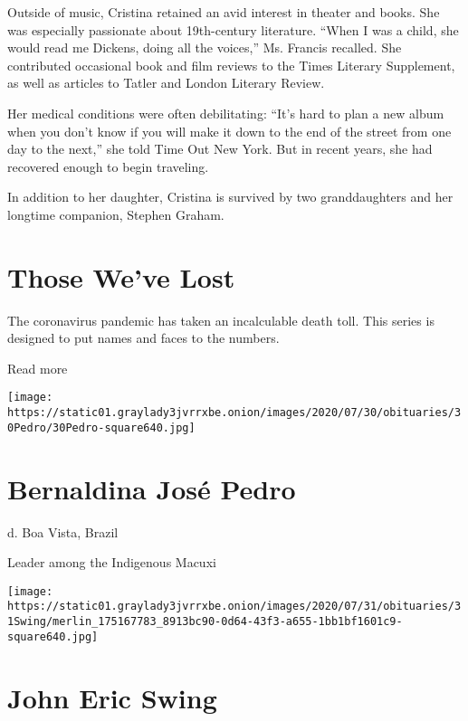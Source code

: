 Outside of music, Cristina retained an avid interest in theater and
books. She was especially passionate about 19th-century literature.
``When I was a child, she would read me Dickens, doing all the voices,''
Ms. Francis recalled. She contributed occasional book and film reviews
to the Times Literary Supplement, as well as articles to Tatler and
London Literary Review.

Her medical conditions were often debilitating: ``It's hard to plan a
new album when you don't know if you will make it down to the end of the
street from one day to the next,'' she told Time Out New York. But in
recent years, she had recovered enough to begin traveling.

In addition to her daughter, Cristina is survived by two granddaughters
and her longtime companion, Stephen Graham.

\href{https://www.nytimes3xbfgragh.onion/interactive/2020/obituaries/people-died-coronavirus-obituaries.html?action=click\&pgtype=Article\&state=default\&region=BELOW_MAIN_CONTENT\&context=covid_obits_promo}{}

\hypertarget{those-weve-lost}{%
\section{Those We've Lost}\label{those-weve-lost}}

The coronavirus pandemic has taken an incalculable death toll. This
series is designed to put names and faces to the numbers.

Read more

\texttt{[image: https://static01.graylady3jvrrxbe.onion/images/2020/07/30/obituaries/30Pedro/30Pedro-square640.jpg]}

\hypertarget{bernaldina-josuxe9-pedro}{%
\section{Bernaldina José Pedro}\label{bernaldina-josuxe9-pedro}}

d. Boa Vista, Brazil

Leader among the Indigenous Macuxi

\texttt{[image: https://static01.graylady3jvrrxbe.onion/images/2020/07/31/obituaries/31Swing/merlin\_175167783\_8913bc90-0d64-43f3-a655-1bb1bf1601c9-square640.jpg]}

\hypertarget{john-eric-swing}{%
\section{John Eric Swing}\label{john-eric-swing}}

